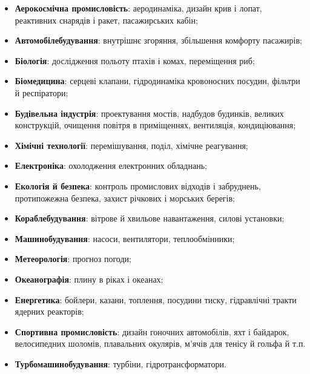 \begin{itemize}
    \item \textbf{Аерокосмічна промисловість}: аеродинаміка, дизайн крив і лопат, реактивних снарядів і ракет, пасажирських кабін;
    \item \textbf{Автомобілебудування}: внутрішнє згоряння, збільшення комфорту пасажирів;
    \item \textbf{Біологія}: дослідження польоту птахів і комах, переміщення риб;
    \item \textbf{Біомедицина}: серцеві клапани, гідродинаміка кровоносних посудин, фільтри й респіратори;
    \item \textbf{Будівельна індустрія}: проектування мостів, надбудов будинків, великих конструкцій, очищення повітря в приміщеннях, вентиляція, кондиціювання;
    \item \textbf{Хімічні технології}: перемішування, поділ, хімічне реагування;
    \item \textbf{Електроніка}: охолодження електронних обладнань;
    \item \textbf{Екологія й безпека}: контроль промислових відходів і забруднень, протипожежна безпека, захист річкових і морських берегів;
    \item \textbf{Кораблебудування}: вітрове й хвильове навантаження, силові установки;
    \item \textbf{Машинобудування}: насоси, вентилятори, теплообмінники;
    \item \textbf{Метеорологія}: прогноз погоди;
    \item \textbf{Океанографія}: плину в ріках і океанах;
    \item \textbf{Енергетика}: бойлери, казани, топлення, посудини тиску, гідравлічні тракти ядерних реакторів;
    \item \textbf{Спортивна промисловість}: дизайн гоночних автомобілів, яхт і байдарок, велосипедних шоломів, плавальних окулярів, м'ячів для тенісу й гольфа й т.п.
    \item \textbf{Турбомашинобудування}: турбіни, гідротрансформатори.
\end{itemize}

